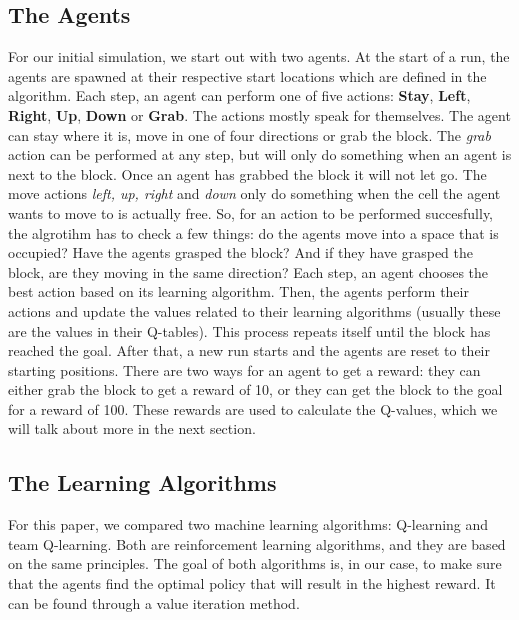 \subsection{The Agents}
For our initial simulation, we start out with two agents. At the start of a run, the agents are spawned at their respective start locations which are defined in the algorithm. Each step, an agent can perform one of five actions: \textbf{Stay}, \textbf{Left}, \textbf{Right}, \textbf{Up}, \textbf{Down} or \textbf{Grab}. The actions mostly speak for themselves. The agent can stay where it is, move in one of four directions or grab the block. The \textit{grab} action can be performed at any step, but will only do something when an agent is next to the block. Once an agent has grabbed the block it will not let go. The move actions \textit{left, up, right} and \textit{down} only do something when the cell the agent wants to move to is actually free. So, for an action to be performed succesfully, the algrotihm has to check a few things: do the agents move into a space that is occupied? Have the agents grasped the block? And if they have grasped the block, are they moving in the same direction? 
Each step, an agent chooses the best action based on its learning algorithm. Then, the agents perform their actions and update the values related to their learning algorithms (usually these are the values in their Q-tables). This process repeats itself until the block has reached the goal. After that, a new run starts and the agents are reset to their starting positions. There are two ways for an agent to get a reward: they can either grab the block to get a reward of 10, or they can get the block to the goal for a reward of 100. These rewards are used to calculate the Q-values, which we will talk about more in the next section.

\subsection{The Learning Algorithms}
For this paper, we compared two machine learning algorithms: Q-learning and team Q-learning. Both are reinforcement learning algorithms, and they are based on the same principles. The goal of both algorithms is, in our case, to make sure that the agents find the optimal policy that will result in the highest reward. It can be found through a value iteration method.

